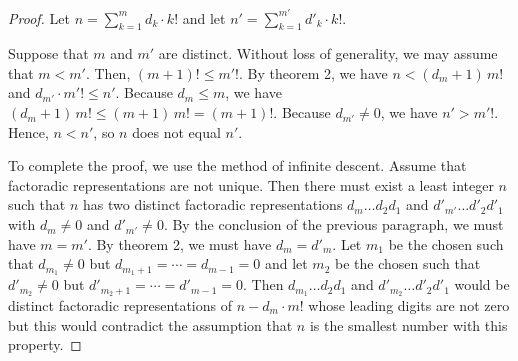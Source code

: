 \documentclass[12pt]{article}
\begin{document}
\begin{proof}
Let $n = \sum_{k=1}^m d_k \cdot k!$ and let $n' = \sum_{k=1}^{m'} 
{d'}_k \cdot k!$.

Suppose that $m$ and $m'$ are distinct.  Without loss of generality,
we may assume that $m < m'$.  Then, $(m+1)! \le {m'}!$.  By theorem 2, 
we have $n < (d_m + 1) \, m!$ and $d_{m'} \cdot {m'}! \le n'$.  Because
$d_m \le m$, we have $(d_m + 1) \,m! \le (m + 1) \, m! = (m + 1)!$.
Because $d_{m'} \neq 0$, we have $n' > {m'}!$.  Hence, $n < n'$, so $n$ 
does not equal $n'$.

To complete the proof, we use the method of infinite descent.  Assume
that factoradic representations are not unique.  Then there must exist
a least integer $n$ such that $n$ has two distinct factoradic 
representations $d_m \ldots d_2 d_1$ and ${d'}_{m'} \ldots {d'}_2 {d'}_1$
with $d_m \neq 0$ and ${d'}_{m'} \neq 0$.  By the conclusion of the
previous paragraph, we must have $m = m'$.  By theorem 2, we must have
$d_m = {d'}_m$. Let $m_1$ be the chosen such
that $d_{m_1} \neq 0$ but $d_{m_1 + 1} = \cdots = d_{m-1} = 0$ and let
$m_2$ be the chosen such that ${d'}_{m_2} \neq 0$ but ${d'}_{m_2 + 1} = 
\cdots = {d'}_{m-1} = 0$.  Then $d_{m_1} \ldots d_2 d_1$ and ${d'}_{m_2}
\ldots {d'}_2 {d'}_1$ would be distinct factoradic representations of
$n - d_m \cdot m!$ whose leading digits are not zero but this would 
contradict the assumption that $n$ is the smallest number with this
property. 
\end{proof}
\end{document}
